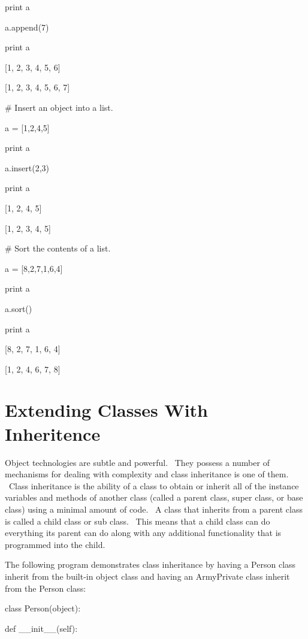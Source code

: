 \documentclass[12pt,twoside]{book}
\begin{document}
print a

a.append(7)

print a

{\textbar}

[1, 2, 3, 4, 5, 6]

[1, 2, 3, 4, 5, 6, 7]


\bigskip

\# Insert an object into a list.

a = [1,2,4,5]

print a

a.insert(2,3)

print a

{\textbar}

[1, 2, 4, 5]

[1, 2, 3, 4, 5]

\# Sort the contents of a list.

a = [8,2,7,1,6,4]

print a

a.sort()

print a

{\textbar}

[8, 2, 7, 1, 6, 4]

[1, 2, 4, 6, 7, 8]

\section[Extending Classes With Inheritence]{
Extending Classes With Inheritence}

Object technologies are subtle and powerful. \ They possess a number of
mechanisms for dealing with complexity and class inheritance is one of
them. \ Class inheritance is the ability of a class to obtain or
inherit all of the instance variables and methods of another class
(called a parent class, super class, or base class) using a minimal
amount of code. \ A class that inherits from a parent class is called a
child class or sub class. \ This means that a child class can do
everything its parent can do along with any additional functionality
that is programmed into the child. \ 


\bigskip

The following program demonstrates class inheritance by having a Person
class inherit from the built{}-in object class and having an
ArmyPrivate class inherit from the Person class:


\bigskip

class Person(object):

 def \_\_init\_\_(self):
\end{document}
